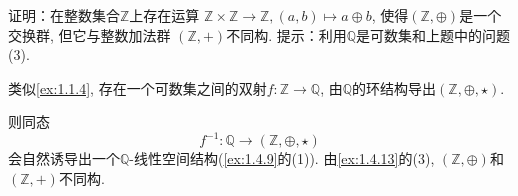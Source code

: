 \begin{problem}
    证明：在整数集合$\mathbb{Z}$上存在运算
$\mathbb{Z} \times \mathbb{Z} \to \mathbb{Z}, (a,b) \mapsto a \oplus b$,
使得$(\mathbb{Z}, \oplus)$是一个交换群, 但它与整数加法群
$(\mathbb{Z}, +)$不同构. 提示：利用$\mathbb{Q}$是可数集和上题中的问题(3).
\end{problem}

\begin{solution}
    类似\ref{ex:1.1.4}, 存在一个可数集之间的双射$f: \mathbb{Z} \to \mathbb{Q}$, 由$\mathbb{Q}$的环结构导出$(\mathbb{Z}, \oplus, \star)$.
    
    则同态
    \[
        f^{-1}: \mathbb{Q} \to (\mathbb{Z}, \oplus, \star)
    \]
    会自然诱导出一个$\mathbb{Q}$-线性空间结构(\ref{ex:1.4.9}的(1)). 由\ref{ex:1.4.13}的(3),
    $(\mathbb{Z}, \oplus)$和$(\mathbb{Z}, +)$不同构.
\end{solution}